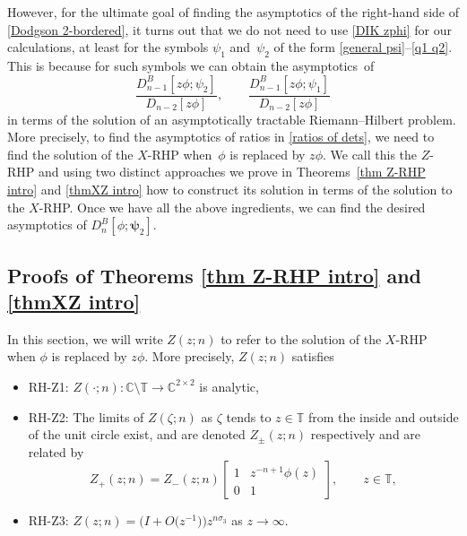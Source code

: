 \documentclass[pdftex]{sigma}
\numberwithin{equation}{section}
\newcommand{\C}{{\mathbb C}}
\newcommand{\T}{{\mathbb T}}
\newcommand{\ze}{\zeta}
\begin{document}
	However, for the ultimate goal of finding the asymptotics of the right-hand side of \eqref{Dodgson 2-bordered}, it turns out that we do not need to use \eqref{DIK zphi} for our calculations, at least for the symbols $\psi_1$ and~$\psi_2$ of the form \eqref{general psi}--\eqref{q1 q2}. This is because for such symbols we can obtain the asymptotics~of
	\begin{equation}\label{ratios of dets}
		\frac{D^B_{n-1}[z\phi;\psi_2]}{D_{n-2}[z \phi]},\qquad \frac{D^B_{n-1}[z\phi;\psi_1]}{D_{n-2}[z \phi]}
	\end{equation}
	in terms of the solution of an asymptotically tractable Riemann--Hilbert problem. More precisely, to find the asymptotics of ratios in \eqref{ratios of dets}, we need to find the solution of the $X$-RHP when~$\phi$ is replaced by $z\phi$. We call this the $Z$-RHP and using two distinct approaches we prove in Theorems~\ref{thm Z-RHP intro} and \ref{thmXZ intro} how to construct its solution in terms of the solution to the $X$-RHP. Once we have all the above ingredients, we can find the desired asymptotics of $		D^B_n[\phi;\boldsymbol{\psi}_2]$.
	
	
\subsection{Proofs of Theorems \ref{thm Z-RHP intro} and \ref{thmXZ intro}}
	
	In this section, we will write $Z(z;n)$ to refer to the solution of the $X$-RHP when $\phi$ is replaced by $z\phi$. More precisely, $Z(z;n)$ satisfies
	\begin{itemize}\itemsep=0pt
		\item RH-Z1: %
$Z(\cdot;n)\colon \C\setminus \T \to \C^{2\times2}$ is analytic,
		\item RH-Z2: %
The limits of $Z(\ze;n)$ as $\ze$ tends to $z \in \T $ from the inside and outside of the unit circle exist, and are denoted $Z_{\pm}(z;n)$ respectively and are related by
		\[
			Z_+(z;n)=Z_-(z;n)\begin{bmatrix}
				1 & z^{-n+1}\phi(z) \\
				0 & 1
			\end{bmatrix}, \qquad z \in \T,
		\]
		
		\item RH-Z3: %
$Z(z;n)=\big( I + O\big(z^{-1}\big) \big) z^{n \sigma_3}$ as $z \to \infty$.
	\end{itemize}
	
\end{document}
